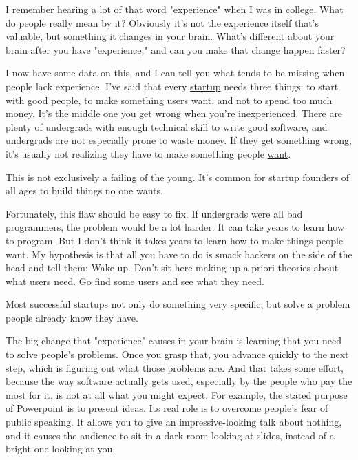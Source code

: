 I remember hearing a lot
                  of that word "experience" when I was in college. What do
                  people really mean by it? Obviously it's not the experience
                  itself that's valuable, but something it changes in your
                  brain. What's different about your brain after you have
                  "experience," and can you make that change happen faster?

I
                  now have some data on this, and I can tell you what tends to
                  be missing when people lack experience. I've said that every
                  \href{http://www.paulgraham.com/start.html}{startup} needs three things: to start
                  with good people, to make something users want, and not to
                  spend too much money. It's the middle one you get wrong when
                  you're inexperienced. There are plenty of undergrads with
                  enough technical skill to write good software, and undergrads
                  are not especially prone to waste money. If they get something
                  wrong, it's usually not realizing they have to make something
                  people \href{http://www.paulgraham.com/bronze.html}{want}.

This is not
                  exclusively a failing of the young. It's common for startup
                  founders of all ages to build things no one wants.

Fortunately,
                  this flaw should be easy to fix. If undergrads were all bad
                  programmers, the problem would be a lot harder. It can take
                  years to learn how to program. But I don't think it takes
                  years to learn how to make things people want. My hypothesis
                  is that all you have to do is smack hackers on the side of the
                  head and tell them: Wake up. Don't sit here making up a priori
                  theories about what users need. Go find some users and see
                  what they need.

Most successful startups not only
                  do something very specific, but solve a problem people already
                  know they have.

The big change that "experience"
                  causes in your brain is learning that you need to solve
                  people's problems. Once you grasp that, you advance quickly to
                  the next step, which is figuring out what those problems are.
                  And that takes some effort, because the way software actually
                  gets used, especially by the people who pay the most for it,
                  is not at all what you might expect. For example, the stated
                  purpose of Powerpoint is to present ideas. Its real role is to
                  overcome people's fear of public speaking. It allows you to
                  give an impressive-looking talk about nothing, and it causes
                  the audience to sit in a dark room looking at slides, instead
                  of a bright one looking at you.


